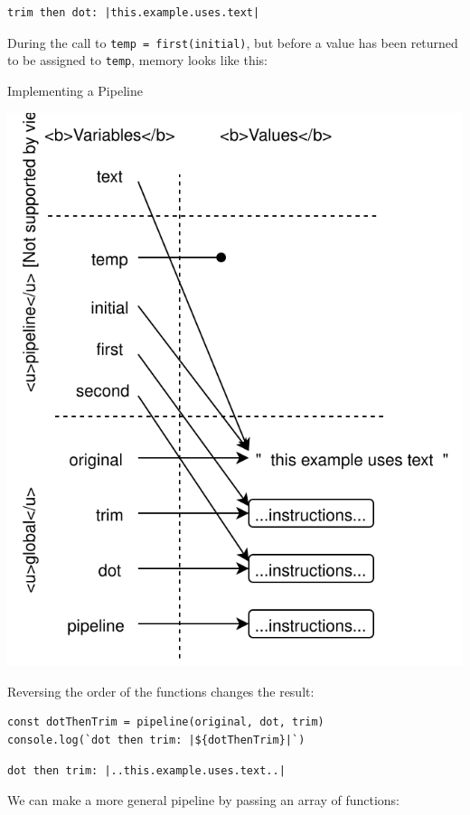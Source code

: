 \begin{verbatim}
trim then dot: |this.example.uses.text|
\end{verbatim}

During the call to \texttt{temp\ =\ first(initial)}, but before a value
has been returned to be assigned to \texttt{temp}, memory looks like
this:

Implementing a Pipeline

\includegraphics{../../files/callbacks-pipeline.svg}

Reversing the order of the functions changes the result:

\begin{verbatim}
const dotThenTrim = pipeline(original, dot, trim)
console.log(`dot then trim: |${dotThenTrim}|`)
\end{verbatim}

\begin{verbatim}
dot then trim: |..this.example.uses.text..|
\end{verbatim}

We can make a more general pipeline by passing an array of functions:

